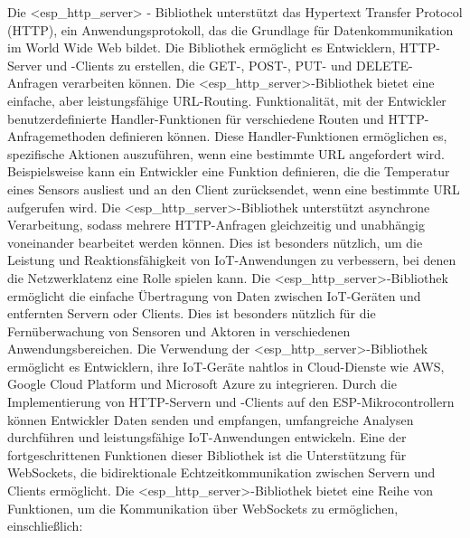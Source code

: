 Die <esp\_http\_server> - Bibliothek unterstützt das Hypertext Transfer Protocol (HTTP), ein Anwendungsprotokoll, das die Grundlage für Datenkommunikation im World Wide Web bildet. 
Die Bibliothek ermöglicht es Entwicklern, HTTP-Server und -Clients zu erstellen, die GET-, POST-, PUT- und DELETE-Anfragen verarbeiten können.
Die <esp\_http\_server>-Bibliothek bietet eine einfache, aber leistungsfähige URL-Routing.
Funktionalität, mit der Entwickler benutzerdefinierte Handler-Funktionen für verschiedene Routen und HTTP-Anfragemethoden definieren können. 
Diese Handler-Funktionen ermöglichen es, spezifische Aktionen auszuführen, wenn eine bestimmte URL angefordert wird. 
Beispielsweise kann ein Entwickler eine Funktion definieren, die die Temperatur eines Sensors ausliest und an den Client zurücksendet, wenn eine bestimmte URL aufgerufen wird.
Die <esp\_http\_server>-Bibliothek unterstützt asynchrone Verarbeitung, sodass mehrere HTTP-Anfragen gleichzeitig und unabhängig voneinander bearbeitet werden können. 
Dies ist besonders nützlich, um die Leistung und Reaktionsfähigkeit von IoT-Anwendungen zu verbessern, bei denen die Netzwerklatenz eine Rolle spielen kann.
Die <esp\_http\_server>-Bibliothek ermöglicht die einfache Übertragung von Daten zwischen IoT-Geräten und entfernten Servern oder Clients. 
\newline
Dies ist besonders nützlich für die Fernüberwachung von Sensoren und Aktoren in verschiedenen Anwendungsbereichen.
Die Verwendung der <esp\_http\_server>-Bibliothek ermöglicht es Entwicklern, ihre IoT-Geräte nahtlos in Cloud-Dienste wie AWS, Google Cloud Platform und Microsoft Azure zu integrieren. 
Durch die Implementierung von HTTP-Servern und -Clients auf den ESP-Mikrocontrollern können Entwickler Daten senden und empfangen, umfangreiche Analysen durchführen und leistungsfähige IoT-Anwendungen entwickeln.
Eine der fortgeschrittenen Funktionen dieser Bibliothek ist die Unterstützung für WebSockets, die bidirektionale Echtzeitkommunikation zwischen Servern und Clients ermöglicht.
Die <esp\_http\_server>-Bibliothek bietet eine Reihe von Funktionen, um die Kommunikation über WebSockets zu ermöglichen, einschließlich:

